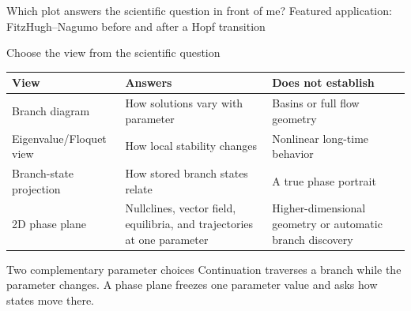   {Which plot answers the scientific question in front of me?}
  {Featured application: FitzHugh--Nagumo before and after a Hopf transition}

\begin{frame}{Choose the view from the scientific question}
\scriptsize
\centering
\renewcommand{\arraystretch}{1.28}
\setlength{\tabcolsep}{3.5pt}
\begin{tabular}{@{}>{\raggedright\arraybackslash}p{}
                  >{\raggedright\arraybackslash}p{}
                  >{\raggedright\arraybackslash}p{}@{}}
\toprule
View & Answers & Does not establish\\
\midrule
Branch diagram
  & How solutions vary with parameter
  & Basins or full flow geometry\\
Eigenvalue/Floquet view
  & How local stability changes
  & Nonlinear long-time behavior\\
Branch-state projection
  & How stored branch states relate
  & A true phase portrait\\
2D phase plane
  & Nullclines, vector field, equilibria, and trajectories at one parameter
  & Higher-dimensional geometry or automatic branch discovery\\
\bottomrule
\end{tabular}
\vspace{3mm}
\begin{block}{Two complementary parameter choices}
Continuation traverses a branch while the parameter changes. A phase plane
freezes one parameter value and asks how states move there.
\end{block}
\end{frame}

